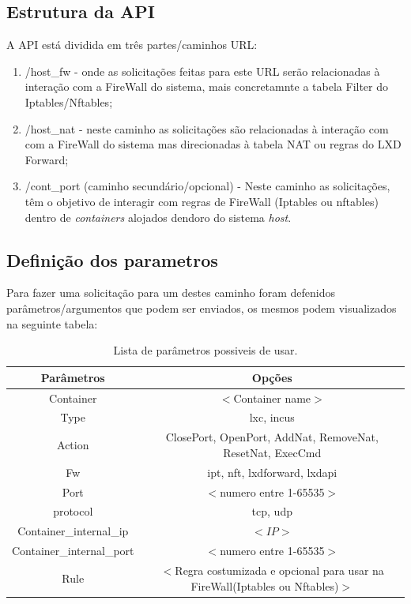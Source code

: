 \subsection{Estrutura da API}

A API está dividida em três partes/caminhos URL:

\begin{enumerate}
    \item  \slash host\_fw - onde as solicitações feitas para este URL serão relacionadas à interação
    com a FireWall do sistema, mais concretamnte a tabela Filter do Iptables\slash Nftables;
    \item  \slash host\_nat - neste caminho as solicitações são relacionadas à interação com
    com a FireWall do sistema mas direcionadas à tabela NAT ou regras do LXD Forward;
    \item  \slash cont\_port (caminho secundário/opcional) - Neste caminho as solicitações, têm o objetivo de interagir com regras de FireWall
    (Iptables ou nftables) dentro de \textit{containers} alojados dendoro do sistema \textit{host}. 
\end{enumerate}



\subsection{Definição dos parametros}

Para fazer uma solicitação para um destes caminho foram defenidos parâmetros\slash argumentos
que podem ser enviados, os mesmos podem visualizados na seguinte tabela:

\begin{table}[H]
\centering
\begin{tabular}{|c|c|}
\hline
\rowcolor{yellow!50}\textbf{Parâmetros} & \textbf{Opções}\\
\hline
Container & $<$Container name$>$\\
\hline
Type & lxc, incus \\
\hline
Action & ClosePort, OpenPort, AddNat, RemoveNat, ResetNat, ExecCmd \\
\hline
Fw & ipt, nft, lxdforward, lxdapi \\
\hline
Port & $<$numero entre 1-65535$>$ \\
\hline
protocol & tcp, udp \\
\hline
Container\_internal\_ip & $<IP>$ \\
\hline
Container\_internal\_port & $<$numero entre 1-65535$>$ \\
\hline
Rule & $<$Regra costumizada e opcional para usar na FireWall(Iptables ou Nftables)$>$ \\
\hline
\end{tabular}
\caption{Lista de parâmetros possiveis de usar.}
\label{arglist}
\end{table}

